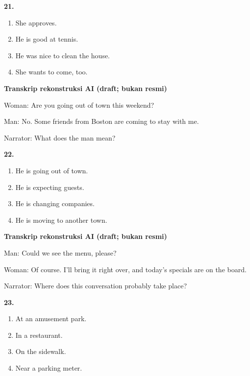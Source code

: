 \documentclass[12pt]{article}
\begin{document}
\noindent\textbf{21.}
\begin{enumerate}[label=(\Alph*),leftmargin=*,itemsep=0.2em]
\item She approves.
\item He is good at tennis.
\item He was nice to clean the house.
\item She wants to come, too.
\end{enumerate}
\par
\vspace{0.25\baselineskip}
\begin{exampleblock}
\textbf{Transkrip rekonstruksi AI (draft; bukan resmi)}\par
Woman: Are you going out of town this weekend?\par
Man: No. Some friends from Boston are coming to stay with me.\par
Narrator: What does the man mean?\par
\end{exampleblock}
\noindent\textbf{22.}
\begin{enumerate}[label=(\Alph*),leftmargin=*,itemsep=0.2em]
\item He is going out of town.
\item He is expecting guests.
\item He is changing companies.
\item He is moving to another town.
\end{enumerate}
\par
\vspace{0.25\baselineskip}
\begin{exampleblock}
\textbf{Transkrip rekonstruksi AI (draft; bukan resmi)}\par
Man: Could we see the menu, please?\par
Woman: Of course. I'll bring it right over, and today's specials are on the board.\par
Narrator: Where does this conversation probably take place?\par
\end{exampleblock}
\noindent\textbf{23.}
\begin{enumerate}[label=(\Alph*),leftmargin=*,itemsep=0.2em]
\item At an amusement park.
\item In a restaurant.
\item On the sidewalk.
\item Near a parking meter.
\end{enumerate}
\end{document}
